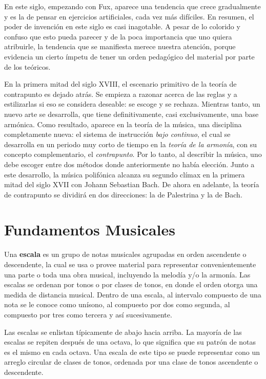 \documentclass[letterpaper,12pt]{book}
\theoremstyle{definition} \newtheorem{Def}{Definición}[chapter]
\theoremstyle{definition} \newtheorem{Teo}{Teorema}[chapter]
\theoremstyle{definition} \newtheorem{Pro}{Proposición}[chapter]
\theoremstyle{definition} \newtheorem{Lema}{Lema}[chapter]
\begin{document}
En este siglo, empezando con Fux,  aparece una tendencia que crece gradualmente y es la de pensar en ejercicios artificiales, cada vez más difíciles. En resumen, el poder de invención en este siglo es casi inagotable. A pesar de lo colorido y confuso que esto pueda parecer y de la poca importancia que uno quiera atribuirle, la tendencia que se manifiesta merece nuestra atención, porque evidencia un cierto ímpetu de tener un orden pedagógico del material por parte de los teóricos.

En la primera mitad del siglo XVIII, el escenario primitivo de la teoría de contrapunto es dejado atrás. Se empieza a razonar acerca de las reglas y a estilizarlas si eso se considera deseable: se escoge y se rechaza. Mientras tanto, un nuevo arte se desarrolla, que tiene definitivamente, casi exclusivamente, una base armónica. Como resultado, aparece en la teoría de la música, una disciplina completamente nueva: el sistema de instrucción \emph{bajo continuo}, el cual se desarrolla en un periodo muy corto de tiempo en la \emph{teoría de la armonía}, con su concepto complementario, el \emph{contrapunto}. Por lo tanto, al describir la música, uno debe escoger entre dos métodos donde anteriormente no había elección. Junto a este desarrollo, la música polifónica alcanza su segundo clímax en la primera mitad del siglo XVII con Johann Sebastian Bach. De ahora en adelante, la teoría de contrapunto se dividirá en dos direcciones: la de Palestrina y la de Bach. 

\section{Fundamentos Musicales} \label{Fundamentos}

Una \textbf{escala} es un grupo de notas musicales agrupadas en orden ascendente o descendente, la cual se usa o provee material para representar convenientemente una parte o toda una obra musical, incluyendo la melodía y/o la armonía. Las escalas se ordenan por tonos o por clases de tonos, en donde el orden otorga una medida de distancia musical. Dentro de una escala, al intervalo compuesto de una nota se le conoce como unísono, al compuesto por dos como segunda, al compuesto por tres como tercera y así sucesivamente. 

Las escalas se enlistan típicamente de abajo hacia arriba. La mayoría de las escalas se repiten después de una octava, lo que significa que su patrón de notas es el mismo en cada octava. Una escala de este tipo se puede representar cono un arreglo circular de clases de tonos, ordenada por una clase de tonos ascendente o descendente. 
\end{document}
